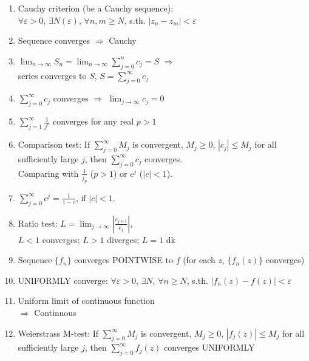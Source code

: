 \documentclass[11pt,a4paper]{article}
\begin{document}
\begin{multicols}{2}
\begin{enumerate}[resume]
\item Cauchy criterion (be a Cauchy sequence): \\$\forall \varepsilon > 0$, $\exists N(\varepsilon)$, $\forall n, m \geq N$, s.th. $|z_n - z_m| < \varepsilon$

\item Sequence converges $\Rightarrow$ Cauchy

\item $\displaystyle \lim_{n \to \infty} S_n = \lim_{n \to \infty} \sum_{j=0}^n c_j = S$ $\Rightarrow$ \\series converges to $S$, $S = \displaystyle \sum_{j=0}^{\infty} c_j$

\item $\displaystyle \sum_{j=0}^{\infty} c_j$ converges $\Rightarrow$ $\displaystyle \lim_{j \to \infty} c_j =0$

\item $\displaystyle \sum_{j=1}^{\infty} \frac{1}{j^p}$ converges for any real $p>1$

\item Comparison test: If $\sum_{j=0}^{\infty} M_j$ is convergent, $M_j \geq 0$, $|c_j| \leq M_j$ for all sufficiently large $j$, then $\sum_{j=0}^{\infty} c_j$ converges. \\Comparing with $\frac{1}{j_p}$ ($p>1$) or $c^j$ ($|c|<1$). 

\item $\displaystyle \sum_{j=0}^{\infty} c^j = \frac{1}{1-c}$, if $|c|<1$. 

\item Ratio test: $L = \displaystyle \lim_{j \to \infty} \left| \frac{c_{j+1}}{c_j} \right|$, \\$L<1$ converges; $L>1$ diverges; $L=1$ dk

\item Sequence $\{ f_n \}$ converges POINTWISE to $f$ (for each $z$, $\{ f_n(z) \}$ converges)

\item UNIFORMLY converge: $\forall \varepsilon >0$, $\exists N$, $\forall n \geq N$, s.th. $|f_n(z) - f(z)| < \varepsilon$

\item Uniform limit of continuous function \\$\Rightarrow$ Continuous

\item Weierstrass M-test: If $\sum_{j=0}^{\infty} M_j$ is convergent, $M_j \geq 0$, $|f_j(z)| \leq M_j$ for all sufficiently large $j$, then $\sum_{j=0}^{\infty} f_j(z)$ converges UNIFORMLY


\end{enumerate}
\end{multicols}
\end{document}
